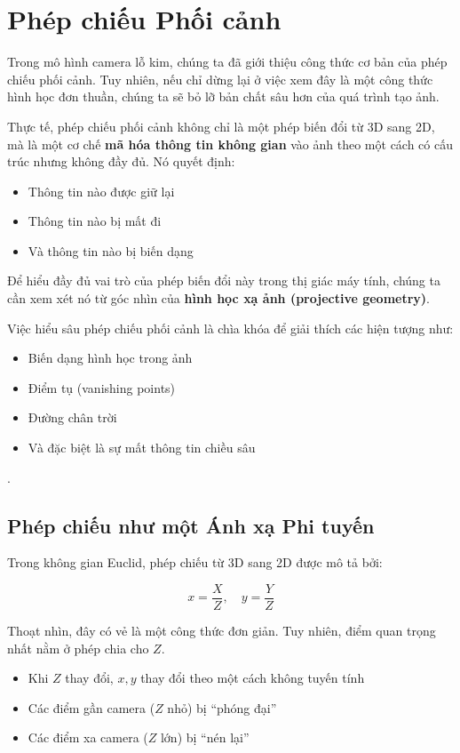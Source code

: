 \section{Phép chiếu Phối cảnh}
\label{sec:perspective_projection}

Trong mô hình camera lỗ kim, chúng ta đã giới thiệu công thức cơ bản của phép chiếu phối cảnh. Tuy nhiên, nếu chỉ dừng lại ở việc xem đây là một công thức hình học đơn thuần, chúng ta sẽ bỏ lỡ bản chất sâu hơn của quá trình tạo ảnh.

Thực tế, phép chiếu phối cảnh không chỉ là một phép biến đổi từ 3D sang 2D, mà là một cơ chế \textbf{mã hóa thông tin không gian} vào ảnh theo một cách có cấu trúc nhưng không đầy đủ. Nó quyết định:
\begin{itemize}
	\item Thông tin nào được giữ lại
	\item Thông tin nào bị mất đi
	\item Và thông tin nào bị biến dạng
\end{itemize}

Để hiểu đầy đủ vai trò của phép biến đổi này trong thị giác máy tính, chúng ta cần xem xét nó từ góc nhìn của \textbf{hình học xạ ảnh (projective geometry)}.

Việc hiểu sâu phép chiếu phối cảnh là chìa khóa để giải thích các hiện tượng như:
\begin{itemize}
	\item Biến dạng hình học trong ảnh
	\item Điểm tụ (vanishing points)
	\item Đường chân trời
	\item Và đặc biệt là sự mất thông tin chiều sâu
\end{itemize}
\cite{Hartley2003, Faugeras1993, Forsyth2002}.

\subsection{Phép chiếu như một Ánh xạ Phi tuyến}
\label{subsec:perspective_nonlinear}

Trong không gian Euclid, phép chiếu từ 3D sang 2D được mô tả bởi:

\[
x = \frac{X}{Z}, \quad y = \frac{Y}{Z}
\]

Thoạt nhìn, đây có vẻ là một công thức đơn giản. Tuy nhiên, điểm quan trọng nhất nằm ở phép chia cho $Z$.

\begin{itemize}
	\item Khi $Z$ thay đổi, $x, y$ thay đổi theo một cách không tuyến tính
	\item Các điểm gần camera ($Z$ nhỏ) bị “phóng đại”
	\item Các điểm xa camera ($Z$ lớn) bị “nén lại”
\end{itemize}

